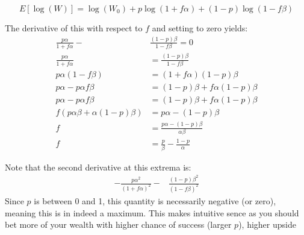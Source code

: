 \documentclass{article}[12pt]
\begin{document}
$$E[\log(W)] = \log(W_0) + p\log(1+f\alpha) + (1-p)\log(1-f\beta) $$

The derivative of this with respect to $f$ and setting to zero yields:
\begin{align*}
\frac{p\alpha}{1+f\alpha} - &\frac{(1-p)\beta}{1-f\beta} = 0\\
\frac{p\alpha}{1+f\alpha} &= \frac{(1-p)\beta}{1-f\beta}\\
p\alpha(1-f\beta) &= (1+f\alpha)(1-p)\beta\\
p\alpha-p\alpha f \beta &= (1-p)\beta +f\alpha(1-p)\beta\\
p\alpha-p\alpha f \beta &= (1-p)\beta +f\alpha(1-p)\beta\\
f(p\alpha \beta+\alpha(1-p)\beta) &= p\alpha - (1-p)\beta\\
f &= \frac{p\alpha - (1-p)\beta}{\alpha \beta}\\
f &= \frac{p}{\beta} - \frac{1-p}{\alpha}
\end{align*} 

Note that the second derivative at this extrema is:
\begin{align*}
-\frac{p\alpha^2}{(1+f\alpha)^2} - &\frac{(1-p)\beta^2}{(1-f\beta)^2}
\end{align*} 
Since $p$ is between 0 and 1, this quantity is necessarily negative (or zero), meaning this is in indeed a maximum. This makes intuitive sence as you should bet more of your wealth with higher chance of success (larger $p$), higher upside 
\end{document}
